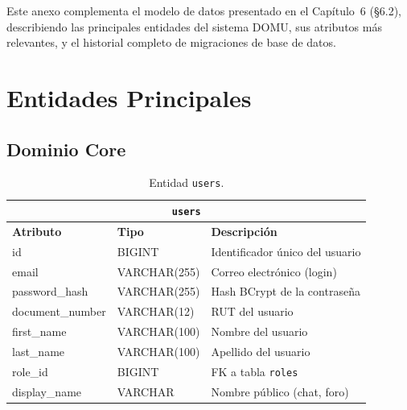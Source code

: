 
Este anexo complementa el modelo de datos presentado en el Capítulo~6 (§6.2), describiendo las principales entidades del sistema DOMU, sus atributos más relevantes, y el historial completo de migraciones de base de datos.

\section{Entidades Principales}

\subsection{Dominio Core}

\begin{table}[H]
\centering
\small
\begin{tabular}{|p{}|p{}|p{}|}
\hline
\multicolumn{3}{|c|}{\textbf{\texttt{users}}} \\ \hline
\textbf{Atributo} & \textbf{Tipo} & \textbf{Descripción} \\ \hline
id & BIGINT & Identificador único del usuario \\ \hline
email & VARCHAR(255) & Correo electrónico (login) \\ \hline
password\_hash & VARCHAR(255) & Hash BCrypt de la contraseña \\ \hline
document\_number & VARCHAR(12) & RUT del usuario \\ \hline
first\_name & VARCHAR(100) & Nombre del usuario \\ \hline
last\_name & VARCHAR(100) & Apellido del usuario \\ \hline
role\_id & BIGINT & FK a tabla \texttt{roles} \\ \hline
display\_name & VARCHAR & Nombre público (chat, foro) \\ \hline
\end{tabular}
\caption{Entidad \texttt{users}.}
\end{table}

